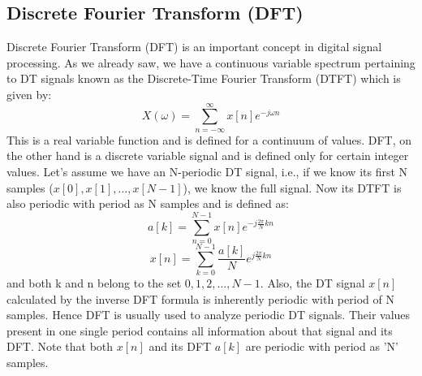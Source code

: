 \documentclass[12pt, a4paper]{article}
\begin{document}
\subsection{Discrete Fourier Transform (DFT)}
Discrete Fourier Transform (DFT) is an important concept in digital signal processing. As we already saw, we have a continuous variable spectrum pertaining to DT signals known as the Discrete-Time Fourier Transform (DTFT) which is given by:
\begin{equation*}
    X(\omega) = \sum_{n=-\infty}^{\infty}x[n]e^{-j\omega n}
\end{equation*}
This is a real variable function and is defined for a continuum of values. DFT, on the other hand is a discrete variable signal and is defined only for certain integer values. Let's assume we have an N-periodic DT signal, i.e., if we know its first N samples ($x[0], x[1], \ldots , x[N-1]$), we know the full signal. Now its DTFT is also periodic with period as N samples and is defined as:
\begin{equation*}
    a[k] = \sum_{n=0}^{N-1}x[n]e^{-j \frac{2\pi}{N} kn}
\end{equation*}
\begin{equation*}
    x[n] = \sum_{k=0}^{N-1}\frac{a[k]}{N}e^{j \frac{2\pi}{N} kn}
\end{equation*}
and both k and n belong to the set $0,1,2,\ldots, N-1$. Also, the DT signal $x[n]$ calculated by the inverse DFT formula is inherently periodic with period of N samples. Hence DFT is usually used to analyze periodic DT signals. Their values present in one single period contains all information about that signal and its DFT. Note that both $x[n]$ and its DFT $a[k]$ are periodic with period as 'N' samples.
\end{document}
